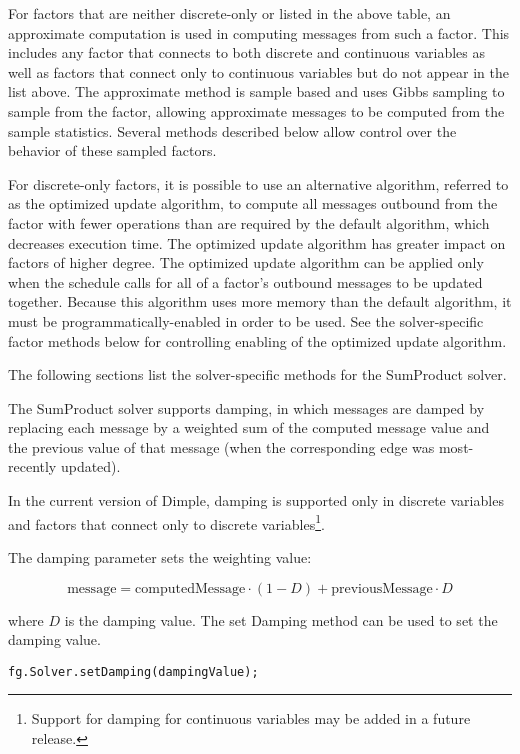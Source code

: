 For factors that are neither discrete-only or listed in the above table, an approximate computation is used in computing messages from such a factor.  This includes any factor that connects to both discrete and continuous variables as well as factors that connect only to continuous variables but do not appear in the list above.  The approximate method is sample based and uses Gibbs sampling to sample from the factor, allowing approximate messages to be computed from the sample statistics.  Several methods described below allow control over the behavior of these sampled factors.

For discrete-only factors, it is possible to use an alternative algorithm, referred to as the optimized update algorithm, to compute all messages outbound from the factor with fewer operations than are required by the default algorithm, which decreases execution time. The optimized update algorithm has greater impact on factors of higher degree. The optimized update algorithm can be applied only when the schedule calls for all of a factor's outbound messages to be updated together. Because this algorithm uses more memory than the default algorithm, it must be programmatically-enabled in order to be used. See the solver-specific factor methods below for controlling enabling of the optimized update algorithm.

The following sections list the solver-specific methods for the SumProduct solver.



The SumProduct solver supports damping, in which messages are damped by replacing each message by a weighted sum of the computed message value and the previous value of that message (when the corresponding edge was most-recently updated).

In the current version of Dimple, damping is supported only in discrete variables and factors that connect only to discrete variables\footnote{Support for damping for continuous variables may be added in a future release.}.

The damping parameter sets the weighting value:

\[
\mathrm{message} = \mathrm{computedMessage} \cdot (1 - D) + \mathrm{previousMessage} \cdot D
\]

where $D$ is the damping value.  The set Damping method can be used to set the damping value.

\ifmatlab
\begin{lstlisting}
fg.Solver.setDamping(dampingValue);
\end{lstlisting}
\fi

